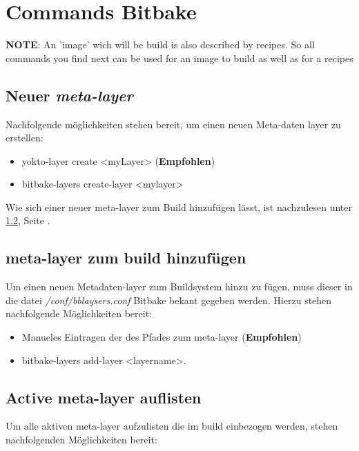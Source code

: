 
\chapter{Commands Bitbake}%
\label{cha:commands_bitbake}

\textbf{NOTE}: An 'image' wich will be build is also described by recipes.
So all commands you find next can be used for an image to build as well as for a
recipes



\section{Neuer \textit{meta-layer}}%
\label{sec:_a_new_recipes}
Nachfolgende möglichkeiten stehen bereit, um einen neuen Meta-daten layer zu
erstellen:
\begin{itemize}
    \item yokto-layer create <myLayer> (\textbf{Empfohlen})
    \item bitbake-layers create-layer <mylayer>
\end{itemize}

Wie sich einer neuer meta-layer zum Build hinzufügen lässt, ist nachzulesen
unter \ref{sec:meta_layer_zum_build_hinzufugen}, Seite
\pageref{sec:meta_layer_zum_build_hinzufugen}.

\section{meta-layer zum build hinzufügen}%
\label{sec:meta_layer_zum_build_hinzufugen}
Um einen neuen Metadaten-layer zum Buildsystem hinzu zu fügen, muss dieser in
die datei \textit{/conf/bblaysers.conf} Bitbake bekant gegeben werden. Hierzu
stehen nachfolgende Möglichkeiten bereit:
\begin{itemize}
    \item Manueles Eintragen der des Pfades zum meta-layer (\textbf{Empfohlen})
    \item bitbake-layers add-layer <layername>.
\end{itemize}



\section{Active meta-layer auflisten}%
\label{sec:active_meta_layer_auflisten}
Um alle aktiven meta-layer aufzulisten die im build einbezogen werden, stehen
nachfolgenden Möglichkeiten bereit:

